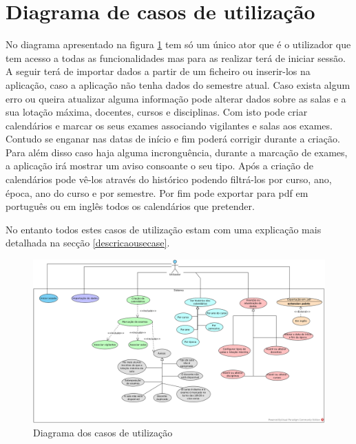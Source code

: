 \documentclass[11pt, twoside]{report}
\begin{document}
	\section{Diagrama de casos de utilização}
	\label{diagrama}
	
	No diagrama apresentado na figura \ref{usecasediagram} tem só um único ator que é o utilizador que tem acesso a todas as funcionalidades mas para as realizar terá de iniciar sessão. A seguir terá de importar dados a partir de um ficheiro ou inserir-los na aplicação, caso a aplicação não tenha dados do semestre atual. Caso exista algum erro ou queira atualizar alguma informação pode alterar dados sobre as salas e a sua lotação máxima, docentes, cursos e disciplinas. Com isto pode criar calendários e marcar os seus exames associando vigilantes e salas aos exames. Contudo se enganar nas datas de início e fim poderá corrigir durante a criação. Para além disso caso haja alguma incronguência, durante a marcação de exames, a aplicação irá mostrar um aviso consoante o seu tipo. Após a criação de calendários pode vê-los através do histórico podendo filtrá-los por curso, ano, época, ano do curso e por semestre. Por fim pode exportar para pdf em português ou em inglês todos os calendários que pretender.
	
	No entanto todos estes casos de utilização estam com uma explicação mais detalhada na secção \ref{descricaousecase}.
	
	
\clearpage
\begin{landscape}
	\pagestyle{empty}
	
		\begin{figure}[H] 
			\centering 			\includegraphics[width=1.3\textwidth,height=1.3\textheight,keepaspectratio]{image/diagrama}
			\caption{Diagrama dos casos de utilização}
			\label{usecasediagram}
		
		\end{figure}
\end{landscape}
\end{document}

